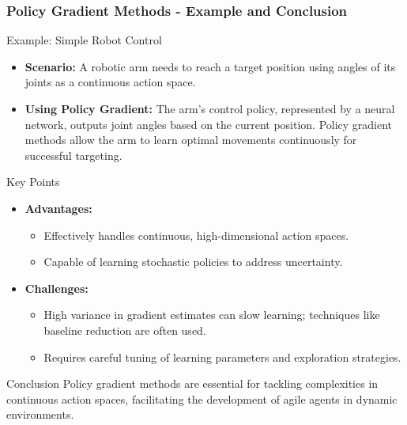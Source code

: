 \documentclass[aspectratio=169]{beamer}
\begin{document}
\begin{frame}[fragile]
    \frametitle{Policy Gradient Methods - Example and Conclusion}
    \begin{block}{Example: Simple Robot Control}
        \begin{itemize}
            \item \textbf{Scenario:} A robotic arm needs to reach a target position using angles of its joints as a continuous action space.
            \item \textbf{Using Policy Gradient:} The arm's control policy, represented by a neural network, outputs joint angles based on the current position. Policy gradient methods allow the arm to learn optimal movements continuously for successful targeting.
        \end{itemize}
    \end{block}
    
    \begin{block}{Key Points}
        \begin{itemize}
            \item \textbf{Advantages:}
            \begin{itemize}
                \item Effectively handles continuous, high-dimensional action spaces.
                \item Capable of learning stochastic policies to address uncertainty.
            \end{itemize}
            \item \textbf{Challenges:}
            \begin{itemize}
                \item High variance in gradient estimates can slow learning; techniques like baseline reduction are often used.
                \item Requires careful tuning of learning parameters and exploration strategies.
            \end{itemize}
        \end{itemize}
    \end{block}
    
    \begin{block}{Conclusion}
        Policy gradient methods are essential for tackling complexities in continuous action spaces, facilitating the development of agile agents in dynamic environments.
    \end{block}
\end{frame}
\end{document}
